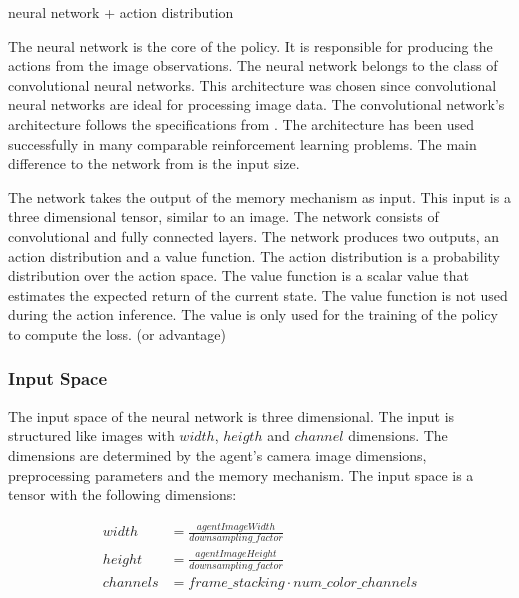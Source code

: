neural network + action distribution

The neural network is the core of the policy. It is responsible for producing the actions from the image observations. The neural network belongs to the class of convolutional neural networks. This architecture was chosen since convolutional neural networks are ideal for processing image data. The convolutional network's architecture follows the specifications from \autocite{nature}. The architecture has been used successfully in many comparable reinforcement learning problems. The main difference to the network from \autocite{nature} is the input size.

The network takes the output of the memory mechanism as input. This input is a three dimensional tensor, similar to an image. The network consists of convolutional and fully connected layers. The network produces two outputs, an action distribution and a value function. The action distribution is a probability distribution over the action space. The value function is a scalar value that estimates the expected return of the current state. The value function is not used during the action inference. The value is only used for the training of the policy to compute the loss. (or advantage)




\subsubsection*{Input Space}

The input space of the neural network is three dimensional. The input is structured like images with $width$, $heigth$ and $channel$ dimensions. The dimensions are determined by the agent's camera image dimensions, preprocessing parameters and the memory mechanism. The input space is a tensor with the following dimensions:

\begin{align*}
    width &= \frac{agentImageWidth}{downsampling\_factor} \\   
    height &= \frac{agentImageHeight}{downsampling\_factor} \\     
    channels &= frame\_stacking \cdot num\_color\_channels
\end{align*}

